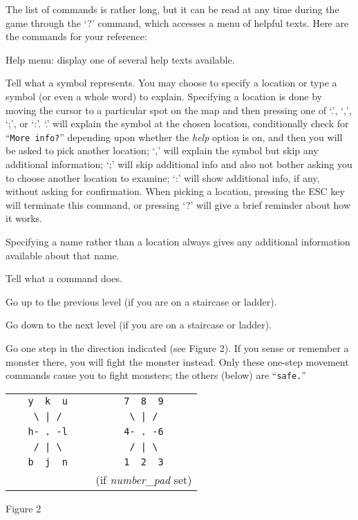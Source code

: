 The list of commands is rather long, but it can be read at any time
during the game through the `?' command, which accesses a menu of
helpful texts.  Here are the commands for your reference:
\blist{}
\item[\tb{?}]
Help menu:  display one of several help texts available.
\item[\tb{/}]
Tell what a symbol represents.  You may choose to specify a location
or type a symbol (or even a whole word) to explain.
Specifying a location is done by moving the cursor to a particular spot
on the map and then pressing one of `.', `,', `;',
or `:'.  `.' will explain the symbol at the chosen location,
conditionally check for ``{\tt More info?}'' depending upon whether the
{\it help }
option is on, and then you will be asked to pick another location;
`,' will explain the symbol but skip any additional
information; `;' will skip additional info and also not bother asking
you to choose another location to examine; `:' will show additional
info, if any, without asking for confirmation.  When picking a location,
pressing the ESC key will terminate this command, or pressing `?'
will give a brief reminder about how it works.

Specifying a name rather than a location
always gives any additional information available about that name.
\item[\tb{\&}]
Tell what a command does.
\item[\tb{<}]
Go up to the previous level (if you are on a staircase or ladder).
\item[\tb{>}]
Go down to the next level (if you are on a staircase or ladder).
\item[\tb{[yuhjklbn]}]
Go one step in the direction indicated (see Figure 2).  If you sense
or remember
a monster there, you will fight the monster instead.  Only these
one-step movement commands cause you to fight monsters; the others
(below) are ``{\tt safe.}''
\begin{center}
\begin{tabular}{cc}
\verb+   y  k  u   + & \verb+   7  8  9   +\\
\verb+    \ | /    + & \verb+    \ | /    +\\
\verb+   h- . -l   + & \verb+   4- . -6   +\\
\verb+    / | \    + & \verb+    / | \    +\\
\verb+   b  j  n   + & \verb+   1  2  3   +\\
                     & (if {\it number\_pad\/} set)
\end{tabular}
\end{center}
\begin{center}
Figure 2
\end{center}

